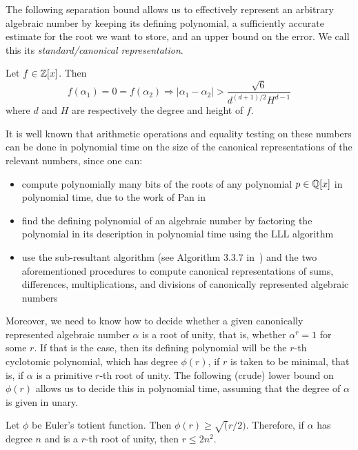 The following separation bound allows us to effectively represent an arbitrary algebraic number by keeping its defining polynomial, a sufficiently accurate estimate for the root we want to store, and an upper bound on the error. We call this its \emph{standard/canonical representation}.

\begin{lemma}[Mignotte]
Let $f\in\mathbb{Z}[x]$. Then
\begin{equation}
f(\alpha_1)=0=f(\alpha_2)\Rightarrow \lvert \alpha_1-\alpha_2\rvert>\frac{\sqrt{6}}{d^{(d+1)/2}H^{d-1}}
\end{equation}
where $d$ and $H$ are respectively the degree and height of $f$.
\end{lemma}

It is well known that arithmetic operations and equality testing on these numbers can be done in polynomial time on the size of the canonical representations of the relevant numbers, since one can:
\begin{itemize}
\item compute polynomially many bits of the roots of any polynomial $p\in\mathbb{Q}[x]$ in polynomial time, due to the work of Pan in~\cite{Pan97}
\item find the defining polynomial of an algebraic number by factoring the polynomial in its description in polynomial time using the LLL algorithm~\cite{LenstraLenstraLovasz1982}
\item use the sub-resultant algorithm (see Algorithm 3.3.7 in~\cite{Coh93}) and the two aforementioned procedures to compute canonical representations of sums, differences, multiplications, and divisions of canonically represented algebraic numbers
\end{itemize}

Moreover, we need to know how to decide whether a given canonically represented algebraic number $\alpha$ is a root of unity, that is, whether $\alpha^r=1$ for some $r$. If that is the case, then its defining polynomial will be the $r$-th cyclotomic polynomial, which has degree $\phi(r)$, if $r$ is taken to be minimal, that is, if $\alpha$ is a primitive $r$-th root of unity. The following (crude) lower bound on $\phi(r)$ allows us to decide this in polynomial time, assuming that the degree of $\alpha$ is given in unary.

\begin{lemma}
Let $\phi$ be Euler's totient function. Then $\phi(r)\geq\sqrt(r/2)$. Therefore, if $\alpha$ has degree $n$ and is a $r$-th root of unity, then $r\leq 2n^2$.
\end{lemma}

